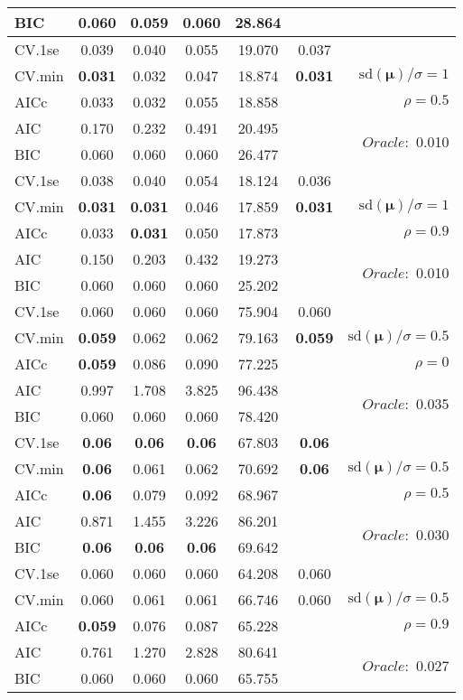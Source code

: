 \begin{table}
\begin{center}
\begin{tabular}{l*{5}{c}|r}
BIC & 0.060 & 0.059 & 0.060 & 28.864 & &  \\
 \hline 
CV.1se & 0.039 & 0.040 & 0.055 & 19.070 & 0.037 & \\
CV.min & {\bf 0.031} & 0.032 & 0.047 & 18.874 & {\bf 0.031} &  $\mathrm{sd}(\mathbf{\mu})/\sigma=1$ \\
AICc & 0.033 & 0.032 & 0.055 & 18.858 & & $\rho=0.5$ \\
AIC & 0.170 & 0.232 & 0.491 & 20.495 & &  \multirow{2}{*}{$Oracle: $ 0.010} \\
BIC & 0.060 & 0.060 & 0.060 & 26.477 & &  \\
 \hline 
CV.1se & 0.038 & 0.040 & 0.054 & 18.124 & 0.036 & \\
CV.min & {\bf 0.031} & {\bf 0.031} & 0.046 & 17.859 & {\bf 0.031} &  $\mathrm{sd}(\mathbf{\mu})/\sigma=1$ \\
AICc & 0.033 & {\bf 0.031} & 0.050 & 17.873 & & $\rho=0.9$ \\
AIC & 0.150 & 0.203 & 0.432 & 19.273 & &  \multirow{2}{*}{$Oracle: $ 0.010} \\
BIC & 0.060 & 0.060 & 0.060 & 25.202 & &  \\
 \hline 
CV.1se & 0.060 & 0.060 & 0.060 & 75.904 & 0.060 & \\
CV.min & {\bf 0.059} & 0.062 & 0.062 & 79.163 & {\bf 0.059} &  $\mathrm{sd}(\mathbf{\mu})/\sigma=0.5$ \\
AICc & {\bf 0.059} & 0.086 & 0.090 & 77.225 & & $\rho=0$ \\
AIC & 0.997 & 1.708 & 3.825 & 96.438 & &  \multirow{2}{*}{$Oracle: $ 0.035} \\
BIC & 0.060 & 0.060 & 0.060 & 78.420 & &  \\
 \hline 
CV.1se & {\bf 0.06} & {\bf 0.06} & {\bf 0.06} & 67.803 & {\bf 0.06} & \\
CV.min & {\bf 0.06} & 0.061 & 0.062 & 70.692 & {\bf 0.06} &  $\mathrm{sd}(\mathbf{\mu})/\sigma=0.5$ \\
AICc & {\bf 0.06} & 0.079 & 0.092 & 68.967 & & $\rho=0.5$ \\
AIC & 0.871 & 1.455 & 3.226 & 86.201 & &  \multirow{2}{*}{$Oracle: $ 0.030} \\
BIC & {\bf 0.06} & {\bf 0.06} & {\bf 0.06} & 69.642 & &  \\
 \hline 
CV.1se & 0.060 & 0.060 & 0.060 & 64.208 & 0.060 & \\
CV.min & 0.060 & 0.061 & 0.061 & 66.746 & 0.060 &  $\mathrm{sd}(\mathbf{\mu})/\sigma=0.5$ \\
AICc & {\bf 0.059} & 0.076 & 0.087 & 65.228 & & $\rho=0.9$ \\
AIC & 0.761 & 1.270 & 2.828 & 80.641 & &  \multirow{2}{*}{$Oracle: $ 0.027} \\
BIC & 0.060 & 0.060 & 0.060 & 65.755 & &  \\
 \hline 
\end{tabular}
\end{center}
\vspace{-1cm}
\end{table}




